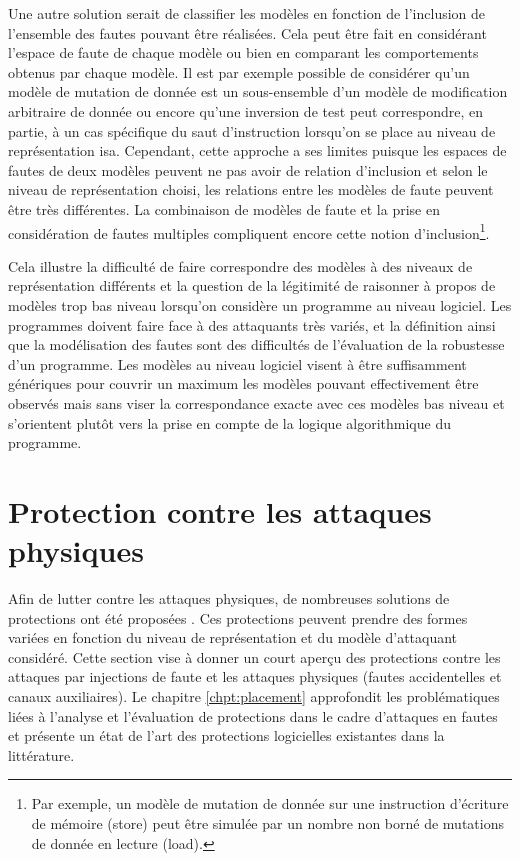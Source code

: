             Une autre solution serait de classifier les modèles en fonction de l'inclusion de l'ensemble des fautes pouvant être réalisées. Cela peut être fait en considérant l'espace de faute de chaque modèle ou bien en comparant les comportements obtenus par chaque modèle. Il est par exemple possible de considérer qu'un modèle de mutation de donnée est un sous-ensemble d'un modèle de modification arbitraire de donnée ou encore qu'une inversion de test peut correspondre, en partie, à un cas spécifique du saut d'instruction lorsqu'on se place au niveau de représentation \gls{isa}.
            Cependant, cette approche a ses limites puisque les espaces de fautes de deux modèles peuvent ne pas avoir de relation d'inclusion et selon le niveau de représentation choisi, les relations entre les modèles de faute peuvent être très différentes. 
            La combinaison de modèles de faute et la prise en considération de fautes multiples compliquent encore cette notion d'inclusion\footnote{Par exemple, un modèle de mutation de donnée sur une instruction d'écriture de mémoire (store) peut être simulée par un nombre non borné de mutations de donnée en lecture (load).}.  
            
            Cela illustre la difficulté de faire correspondre des modèles à des niveaux de représentation différents et la question de la légitimité de raisonner à propos de modèles trop bas niveau lorsqu'on considère un programme au niveau logiciel.
            Les programmes doivent faire face à des attaquants très variés, et la définition ainsi que la modélisation des fautes sont des difficultés de l'évaluation de la robustesse d'un programme.
            Les modèles au niveau logiciel visent à être suffisamment génériques pour couvrir un maximum les modèles pouvant effectivement être observés mais sans viser la correspondance exacte avec ces modèles bas niveau et s'orientent plutôt vers la prise en compte de la logique algorithmique du programme. 
                    
    \section{Protection contre les attaques physiques}
    \label{sec:fi-protections}
        
        Afin de lutter contre les attaques physiques, de nombreuses solutions de protections ont été proposées \cite{BarEl/IEEE06, Yuce/HSS18}. 
        Ces protections peuvent prendre des formes variées en fonction du niveau de représentation et du modèle d'attaquant considéré. Cette section vise à donner un court aperçu des protections contre les attaques par injections de faute et les attaques physiques (fautes accidentelles et canaux auxiliaires). 
        Le chapitre \ref{chpt:placement} approfondit les problématiques liées à l'analyse et l'évaluation de protections dans le cadre d'attaques en fautes et présente un état de l'art des protections logicielles existantes dans la littérature.
        
